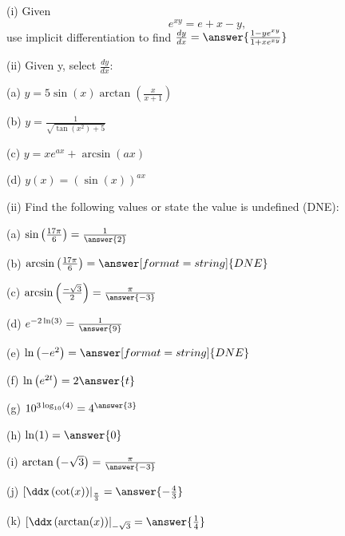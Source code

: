 \documentclass{ximera}
\begin{document}
\begin{exercise}
(i) Given $$e^{xy}=e+x-y,$$ use implicit differentiation to find $\frac{dy}{dx}=\answer{\frac{1-ye^{xy}}{1+xe^{xy}}}$

(ii) Given y, select $\frac{dy}{dx}$:

(a) $y=5\sin(x)\arctan\left(\frac{x}{x+1}\right)$
\begin{multipleChoice}
\end{multipleChoice}
(b) $y=\frac{1}{\sqrt{\tan(x^2)+5}}$
\begin{multipleChoice}
\end{multipleChoice}

(c) $y=xe^{ax}+\arcsin(ax)$
\begin{multipleChoice}
\end{multipleChoice}

(d) $y(x)=\left(\sin(x)\right)^{ax}$
\begin{multipleChoice}
\end{multipleChoice}

(ii) Find the following values or state the value is undefined (DNE):

(a) $\sin\left(\frac{17\pi}{6}\right)=\frac{1}{\answer{2}}$

(b) $\arcsin\left(\frac{17\pi}{6}\right)=\answer[format=string]{DNE}$

(c) $\arcsin\left(\frac{-\sqrt{3}}{2}\right)=\frac{\pi}{\answer{-3}}$

(d) $e^{-2\ln(3)}=\frac{1}{\answer{9}}$

(e) $\ln\left(-e^2\right)=\answer[format=string]{DNE}$

(f) $\ln\left(e^{2t}\right)=2\answer{t}$

(g) $10^{3\log_{10}(4)}=4^{\answer{3}}$

(h) $\ln(1)=\answer{0}$

(i) $\arctan\left(-\sqrt{3}\right)=\frac{\pi}{\answer{-3}}$

(j) $\left[\ddx\left(\cot(x)\right)\right|_{\frac{\pi}{3}}=\answer{-\frac{4}{3}}$

(k) $\left[\ddx\left(\arctan(x)\right)\right|_{-\sqrt{3}}=\answer{\frac{1}{4}}$
\end{exercise}
\end{document}

